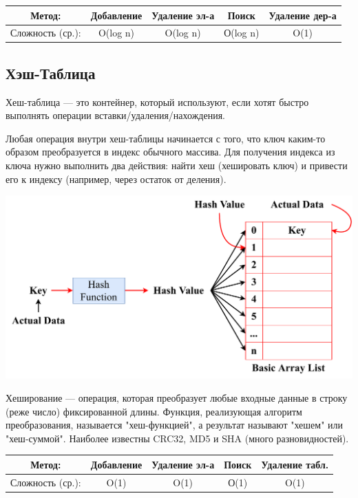 \documentclass[utf8,14pt,a4paper,oneside,russian]{book}
\begin{document}
	\begin{longtable}{c|c|c|c|c}
		Метод: &Добавление&Удаление эл-а&Поиск&Удаление дер-а\\\hline
		Сложность (ср.): &O(log n)&O(log n)&О(log n)&O(1)\\
	\end{longtable}
	
	\subsection{Хэш-Таблица}
	
	Хеш-таблица — это контейнер, который используют, если хотят быстро выполнять операции вставки/удаления/нахождения. 
	
	Любая операция внутри хеш-таблицы начинается с того, что ключ каким-то образом преобразуется в индекс обычного массива. Для получения индекса из ключа нужно выполнить два действия: найти хеш (хешировать ключ) и привести его к индексу (например, через остаток от деления).
	
	\begin{center}
		\includegraphics[scale=0.8]{hash_map}\\
	\end{center}
	
	Хеширование — операция, которая преобразует любые входные данные в строку (реже число) фиксированной длины. Функция, реализующая алгоритм преобразования, называется "хеш-функцией", а результат называют "хешем" или "хеш-суммой". Наиболее известны CRC32, MD5 и SHA (много разновидностей).
	
	\begin{longtable}{c|c|c|c|c}
		Метод: &Добавление&Удаление эл-а&Поиск&Удаление табл.\\\hline
		Сложность (ср.): &O(1)&O(1)&О(1)&O(1)\\
	\end{longtable}
\end{document}
